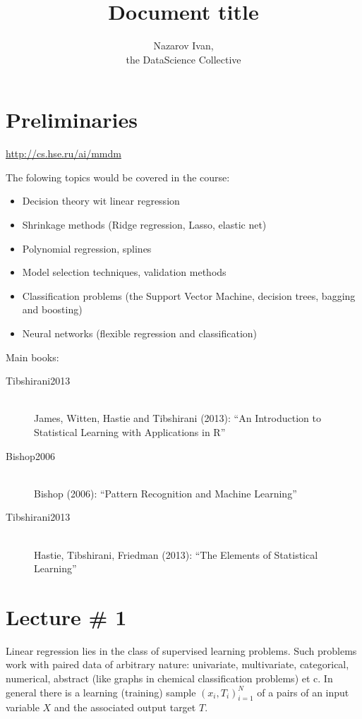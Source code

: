 \documentclass[a4paper]{article}
\title{Document title}
\author{Nazarov Ivan, \rus{101мНОД(ИССА)}\\the DataScience Collective}
\newcommand{\brac}[1]{{\left ( #1 \right )}}
\begin{document}
\maketitle

\section*{Preliminaries} %
\label{sec:preliminaries}

\url{http://cs.hse.ru/ai/mmdm}

The folowing topics would be covered in the course:
\begin{itemize}
	\item Decision theory wit linear regression
	\item Shrinkage methods (Ridge regression, Lasso, elastic net)
	\item Polynomial regression, splines
	\item Model selection techniques, validation methods
	\item Classification problems (the Support Vector Machine, decision trees, bagging and boosting)
	\item Neural networks (flexible regression and classification)
\end{itemize}

Main books:
\begin{description}
	\item[Tibshirani2013] \hfill\\
		James, Witten, Hastie and Tibshirani (2013): ``An Introduction to Statistical Learning with Applications in R''
	\item[Bishop2006] \hfill\\
		Bishop (2006): ``Pattern Recognition and Machine Learning''
	\item[Tibshirani2013] \hfill\\
		Hastie, Tibshirani, Friedman (2013): ``The Elements of Statistical Learning''
\end{description}


\section{Lecture \# 1} %
\label{sec:lecture_1}

Linear regression lies in the class of supervised learning problems.
Such problems work with paired data of arbitrary nature: univariate, multivariate, categorical, numerical, abstract (like graphs in chemical classification problems) et c.
In general there is a learning (training) sample $\brac{x_i, T_i}_{i=1}^N$ of a pairs of an input variable $X$ and the associated output target $T$.
\end{document}
